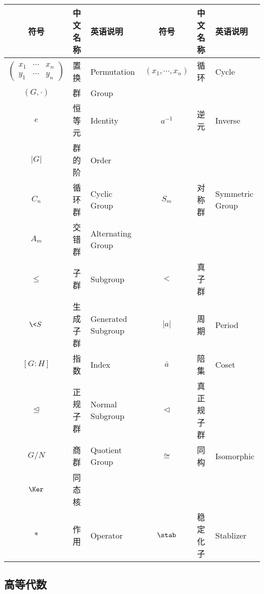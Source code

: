 \documentclass[UTF8]{ctexart}
\begin{document}
            \begin{center}
                \begin{tabular}{|c|l|l||c|l|l|}
                    \hline
                    符号 & 中文名称 & 英语说明 & 符号 & 中文名称 & 英语说明\\
                    \hline\hline
                    $
                    \begin{pmatrix}
                        x_1 & \cdots & x_n\\
                        y_1 & \cdots & y_n
                    \end{pmatrix}$ & 置换 & Permutation & $(x_1,\cdots,x_n)$ & 循环 & Cycle\\
                    \hline
                    $(G,\cdot)$ & 群 & Group\\
                    \hline
                    $e$ & 恒等元 & Identity & $a^{-1}$ & 逆元 & Inverse\\
                    \hline
                    $|G|$ & 群的阶 & Order &\\
                    \hline
                    $C_n$ & 循环群 & Cyclic Group & $S_m$ & 对称群 & Symmetric Group\\
                    \hline
                    $A_m$ & 交错群 & Alternating Group\\
                    \hline
                    $\leq$ & 子群 & Subgroup & $<$ & 真子群 &\\
                    \hline
                    $\<S\>$ & 生成子群 & Generated Subgroup & $|a|$ & 周期 & Period\\
                    \hline
                    $[G:H]$ & 指数 & Index & $\bar{a}$ & 陪集 & Coset\\
                    \hline
                    $\trianglelefteq$ & 正规子群 & Normal Subgroup & $\triangleleft$ & 真正规子群 &\\
                    \hline
                    $G/N$ & 商群 & Quotient Group & $\cong$ & 同构 & Isomorphic\\
                    \hline
                    $\Ker$ & 同态核 &\\
                    \hline
                    $*$ & 作用 & Operator & $\stab$ & 稳定化子 & Stablizer\\
                    \hline
                \end{tabular}
            \end{center}

        \subsection{高等代数}
        
\end{document}
